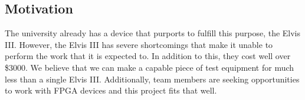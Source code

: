 \subsection{Motivation}
The university already has a device that purports to fulfill this purpose, the Elvis III. However, the Elvis III has severe shortcomings that make it unable to perform the work that it is expected to. In addition to this, they cost well over \$3000. We believe that we can make a capable piece of test equipment for much less than a single Elvis III. Additionally, team members are seeking opportunities to work with FPGA devices and this project fits that well.
